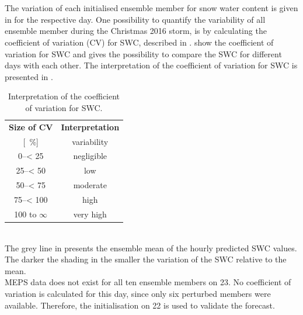 % 
\\
\\
The variation of each initialised ensemble member for snow water content is given in  for the respective day. %
One possibility to quantify the variability of all ensemble member during the Christmas 2016 storm, is by calculating the coefficient of variation (CV) for SWC, described in . 
 show the coefficient of variation for SWC and gives the possibility to compare the SWC for different days with each other. The interpretation of the coefficient of variation for SWC is presented in .
\begin{table}[t!]
	\begin{center}
		\caption{Interpretation of the coefficient of variation for SWC.} \label{tab:verification}
		\begin{tabular}{lc|c}
			\hline\hline
			\multicolumn{2}{c|}{\textbf{Size of CV}} & {\textbf{Interpretation}} \\ 
			\multicolumn{2}{c|}{[\SI{}{\percent}]} & variability \\ \hline \hline 
			\multicolumn{2}{c|}{\numrange{0}{< 25}} & negligible  \\ \hline
			\multicolumn{2}{c|}{\numrange{25}{< 50}} & low \\ \hline
			\multicolumn{2}{c|}{\numrange{50}{< 75}} & moderate \\ \hline
			\multicolumn{2}{c|}{\numrange{75}{< 100}} & high \\ \hline
			\multicolumn{2}{c|}{\num{100} to $\infty$} & very high  \\ \hline \hline
		\end{tabular}
	\end{center}
\end{table}
\noindent
\\
The grey line in  presents the ensemble mean of the hourly predicted SWC values. The darker the shading in  the smaller the variation of the SWC relative to the mean. 
\\
MEPS data does not exist for all ten ensemble members on \SI{23}{\dec}. No coefficient of variation is calculated for this day, since only six perturbed members were available. Therefore, the initialisation on \SI{22}{\dec} is used to validate the forecast. 
